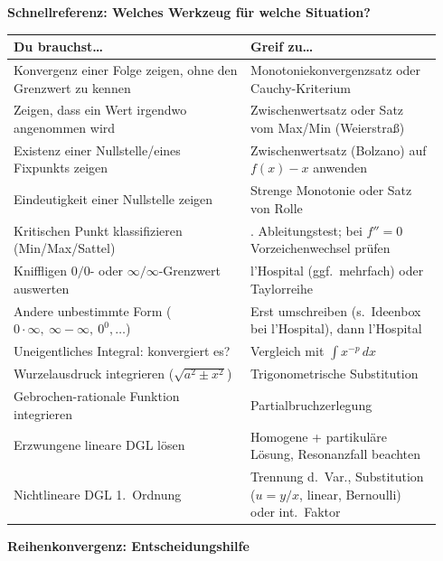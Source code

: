 \vspace{6pt}
\begin{center}
\begin{minipage}[t]{0.56\linewidth}
\centering
{\bfseries\sffamily\color{subText}\fontsize{7.7pt}{9.14pt}\selectfont Schnellreferenz: Welches Werkzeug f\"ur welche Situation?}\\[3pt]
{\fontsize{6.3pt}{7.6pt}\selectfont
\renewcommand{\arraystretch}{1.25}
\setlength{\tabcolsep}{4pt}
\begin{tabular}{>{\raggedright\arraybackslash}p{0.52\linewidth}>{\raggedright\arraybackslash}p{0.42\linewidth}}
\textbf{Du brauchst\ldots} & \textbf{Greif zu\ldots}\\
\hline
Konvergenz einer Folge zeigen, ohne den Grenzwert zu kennen & Monotoniekonvergenzsatz oder Cauchy-Kriterium\\
Zeigen, dass ein Wert irgendwo angenommen wird & Zwischenwertsatz oder Satz vom Max/Min (Weierstra\ss)\\
Existenz einer Nullstelle/eines Fixpunkts zeigen & Zwischenwertsatz (Bolzano) auf $f(x)-x$ anwenden\\
Eindeutigkeit einer Nullstelle zeigen & Strenge Monotonie oder Satz von Rolle\\
Kritischen Punkt klassifizieren (Min/Max/Sattel) & 2. Ableitungstest; bei $f''=0$ Vorzeichenwechsel pr\"ufen\\
Kniffligen $0/0$- oder $\infty/\infty$-Grenzwert auswerten & l'Hospital (ggf.\ mehrfach) oder Taylorreihe\\
Andere unbestimmte Form ($0\cdot\infty,\ \infty-\infty,\ 0^0,\dots$) & Erst umschreiben (s.\ Ideenbox bei l'Hospital), dann l'Hospital\\
Uneigentliches Integral: konvergiert es? & Vergleich mit $\int x^{-p}\,dx$\\
Wurzelausdruck integrieren ($\sqrt{a^2\pm x^2}$) & Trigonometrische Substitution\\
Gebrochen-rationale Funktion integrieren & Partialbruchzerlegung\\
Erzwungene lineare DGL l\"osen & Homogene + partikul\"are L\"osung, Resonanzfall beachten\\
Nichtlineare DGL 1.\ Ordnung & Trennung d.\ Var., Substitution ($u=y/x$, linear, Bernoulli) oder int.\ Faktor\\
\end{tabular}
}
\end{minipage}
\hfill
\begin{minipage}[t]{0.4\linewidth}
\centering
{\bfseries\sffamily\color{subText}\fontsize{7.7pt}{9.14pt}\selectfont Reihenkonvergenz: Entscheidungshilfe}\\[3pt]

\end{minipage}
\end{center}
